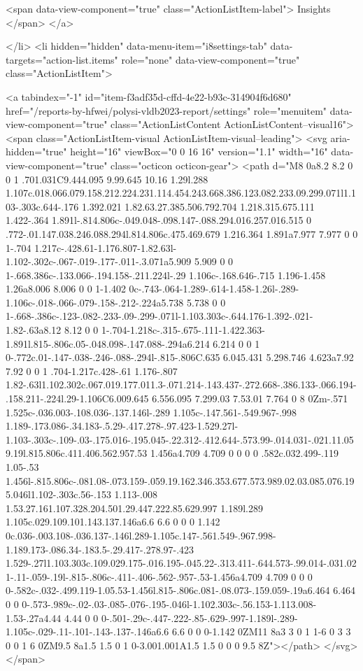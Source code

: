 {{        <span data-view-component="true" class="ActionListItem-label">
          Insights
</span>      
</a>
  
</li>
        <li hidden="hidden" data-menu-item="i8settings-tab" data-targets="action-list.items" role="none" data-view-component="true" class="ActionListItem">
    
    
    <a tabindex="-1" id="item-f3adf35d-cffd-4e22-b93c-314904f6d680" href="/reports-by-hfwei/polysi-vldb2023-report/settings" role="menuitem" data-view-component="true" class="ActionListContent ActionListContent--visual16">
        <span class="ActionListItem-visual ActionListItem-visual--leading">
          <svg aria-hidden="true" height="16" viewBox="0 0 16 16" version="1.1" width="16" data-view-component="true" class="octicon octicon-gear">
    <path d="M8 0a8.2 8.2 0 0 1 .701.031C9.444.095 9.99.645 10.16 1.29l.288 1.107c.018.066.079.158.212.224.231.114.454.243.668.386.123.082.233.09.299.071l1.103-.303c.644-.176 1.392.021 1.82.63.27.385.506.792.704 1.218.315.675.111 1.422-.364 1.891l-.814.806c-.049.048-.098.147-.088.294.016.257.016.515 0 .772-.01.147.038.246.088.294l.814.806c.475.469.679 1.216.364 1.891a7.977 7.977 0 0 1-.704 1.217c-.428.61-1.176.807-1.82.63l-1.102-.302c-.067-.019-.177-.011-.3.071a5.909 5.909 0 0 1-.668.386c-.133.066-.194.158-.211.224l-.29 1.106c-.168.646-.715 1.196-1.458 1.26a8.006 8.006 0 0 1-1.402 0c-.743-.064-1.289-.614-1.458-1.26l-.289-1.106c-.018-.066-.079-.158-.212-.224a5.738 5.738 0 0 1-.668-.386c-.123-.082-.233-.09-.299-.071l-1.103.303c-.644.176-1.392-.021-1.82-.63a8.12 8.12 0 0 1-.704-1.218c-.315-.675-.111-1.422.363-1.891l.815-.806c.05-.048.098-.147.088-.294a6.214 6.214 0 0 1 0-.772c.01-.147-.038-.246-.088-.294l-.815-.806C.635 6.045.431 5.298.746 4.623a7.92 7.92 0 0 1 .704-1.217c.428-.61 1.176-.807 1.82-.63l1.102.302c.067.019.177.011.3-.071.214-.143.437-.272.668-.386.133-.066.194-.158.211-.224l.29-1.106C6.009.645 6.556.095 7.299.03 7.53.01 7.764 0 8 0Zm-.571 1.525c-.036.003-.108.036-.137.146l-.289 1.105c-.147.561-.549.967-.998 1.189-.173.086-.34.183-.5.29-.417.278-.97.423-1.529.27l-1.103-.303c-.109-.03-.175.016-.195.045-.22.312-.412.644-.573.99-.014.031-.021.11.059.19l.815.806c.411.406.562.957.53 1.456a4.709 4.709 0 0 0 0 .582c.032.499-.119 1.05-.53 1.456l-.815.806c-.081.08-.073.159-.059.19.162.346.353.677.573.989.02.03.085.076.195.046l1.102-.303c.56-.153 1.113-.008 1.53.27.161.107.328.204.501.29.447.222.85.629.997 1.189l.289 1.105c.029.109.101.143.137.146a6.6 6.6 0 0 0 1.142 0c.036-.003.108-.036.137-.146l.289-1.105c.147-.561.549-.967.998-1.189.173-.086.34-.183.5-.29.417-.278.97-.423 1.529-.27l1.103.303c.109.029.175-.016.195-.045.22-.313.411-.644.573-.99.014-.031.021-.11-.059-.19l-.815-.806c-.411-.406-.562-.957-.53-1.456a4.709 4.709 0 0 0 0-.582c-.032-.499.119-1.05.53-1.456l.815-.806c.081-.08.073-.159.059-.19a6.464 6.464 0 0 0-.573-.989c-.02-.03-.085-.076-.195-.046l-1.102.303c-.56.153-1.113.008-1.53-.27a4.44 4.44 0 0 0-.501-.29c-.447-.222-.85-.629-.997-1.189l-.289-1.105c-.029-.11-.101-.143-.137-.146a6.6 6.6 0 0 0-1.142 0ZM11 8a3 3 0 1 1-6 0 3 3 0 0 1 6 0ZM9.5 8a1.5 1.5 0 1 0-3.001.001A1.5 1.5 0 0 0 9.5 8Z"></path>
</svg>
        </span>
      
}}
